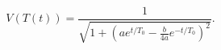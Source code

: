 \begin{equation}\label{vtt}
V(T(t)) =\frac{1}{\sqrt{1+\left(ae^{t/T_0}-\frac{b}{4a}e^{-t/T_0}\right)^2}}.
\end{equation}

